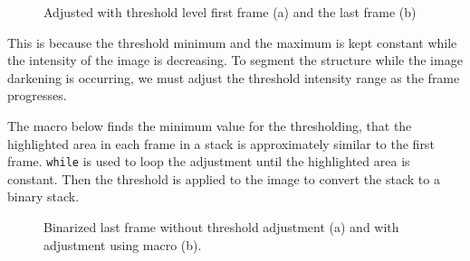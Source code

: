 \documentclass[11pt,a4paper,oneside]{report}
\newcommand{\ilcom}[1]{\texttt{\small#1}}
\begin{document}
\begin{figure}[htbp]
 \centering
 \caption{Adjusted with threshold level first frame (a) and the last frame (b)}
 \label{fig:degradingThreshold}
\end{figure}

This is because the threshold minimum and the maximum is kept constant while the intensity of the image is decreasing. To segment the structure while the image darkening is occurring, we must adjust the threshold intensity range as the frame progresses. 
 
The macro below finds the minimum value for the thresholding, that the highlighted area in each frame in a stack is approximately similar to the first frame. \ilcom{while} is used to loop the adjustment until the highlighted area is constant.  Then the threshold is applied to the image to convert the stack to a binary stack. 



\begin{figure}[htbp]
 \centering
 \caption{Binarized last frame without threshold adjustment (a) and with adjustment using macro (b).}
 \label{fig:ThresholdAdjustResults}
\end{figure}
\end{document}

